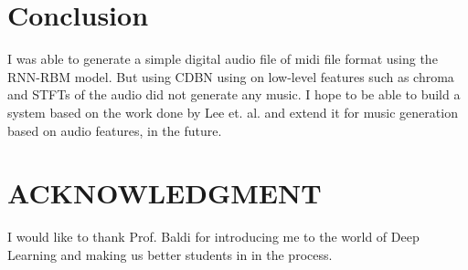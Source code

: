 \documentclass[letterpaper, 10 pt, conference]{ieeeconf}
\begin{document}
\section{Conclusion}
I was able to generate a simple digital audio file of midi file format using the RNN-RBM model. But using CDBN using on low-level features such as chroma and STFTs of the audio did not generate any music. I hope to be able to build a system based on the work done by Lee et. al.\cite{c1} and extend it for music generation based on audio features, in the future.

\addtolength{\textheight}{-12cm}  

\section*{ACKNOWLEDGMENT}
I would like to thank Prof. Baldi for introducing me to the world of Deep Learning and making us better students in in the process.
\end{document}
